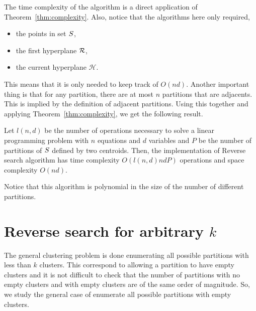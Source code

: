 \documentclass{article}
\newcommand{\cH}{\mathcal{H}}
\begin{document}
The time complexity of the algorithm is a direct application of
Theorem~\ref{thm:complexity}. Also, notice that the algorithms here
only required,
\begin{itemize}
\item the points in set $S$,
\item the first hyperplane $\mathcal{R}$,
\item the current hyperplane $\cH$.
\end{itemize}
This means that it is only needed to keep track of $O(nd)$. Another
important thing is that for any partition, there are at most $n$
partitions that are adjacents. This is implied by the definition of
adjacent partitions. Using this together and applying
Theorem~\ref{thm:complexity}, we get the following result.
\begin{theorem}
  Let $l(n,d)$ be the number of operations necessary to solve a linear
  programming problem with $n$ equations and $d$ variables and $P$ be
  the number of partitions of $S$ defined by two centroids. Then, 
  the implementation of Reverse search algorithm has time complexity 
  $O( l(n,d) n d P)$ operations  and space complexity $O(n d)$.
\end{theorem}
Notice that this algorithm is polynomial in the size of the number of
different partitions. 
\section{Reverse search for arbitrary $k$}
The general clustering problem is done enumerating all possible
partitions with less than $k$ clusters. This correspond to allowing a
partition to have empty clusters and it is not difficult to check
that the number of partitions with no empty clusters and with empty
clusters are of the same order of magnitude. So, we study the general
case of enumerate all possible partitions with empty clusters.
\end{document}
